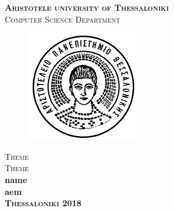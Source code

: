\documentclass[a4paper,11pt]{article}
\newcommand{\lt}{\latintext}
\newcommand{\gt}{\greektext}
\begin{document}
  \lt
	\begin{titlepage}
		\begin{center}
			\textsc{\LARGE \bfseries Aristotele university of Thessaloniki}\\[0.2cm]
			\textsc{\large Computer Science Department}\\	
			\begin{figure}[h!]
				\begin{center}
					\leavevmode
					\includegraphics[scale=0.8, trim = 0mm 0mm 0mm 0mm, clip]{auth.jpg}
				\end{center}
			\end{figure}
			\vspace{2cm}
			\textsc{\Large Theme \\Theme\\\vspace{3cm}}
				\large \bfseries \lt name \\ aem \gt 
			\\
		\vspace*{\fill}
		\vspace{3cm}
		\textsc{Thessaloniki 2018}		
		\end{center}
	\end{titlepage}
	\newpage
\end{document}
